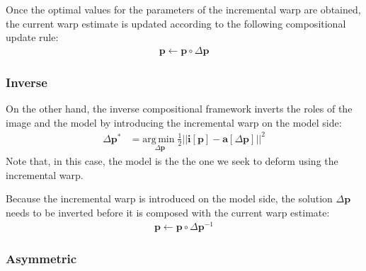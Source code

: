 Once the optimal values for the parameters of the incremental warp are obtained, the current warp estimate is updated according to the following compositional update rule:
\begin{equation}
 	\begin{aligned}
    	\mathbf{p} \leftarrow \mathbf{p} \circ \Delta \mathbf{p}
    \label{eq:fc_update}
    \end{aligned}
\end{equation}

\subsubsection{Inverse}
\label{sec:inverse}

On the other hand, the inverse compositional framework inverts the roles of the image and the model by introducing the incremental warp on the model side:
\begin{equation}
    \begin{aligned}
        \Delta \mathbf{p}^* & = \underset{\Delta \mathbf{p}} {\mathrm{arg\, min\;}} \frac{1}{2}|| \mathbf{i}[\mathbf{p}] - \mathbf{a} [\Delta \mathbf{p}] ||^2
    \label{eq:ssd_ic}
    \end{aligned}
\end{equation}
Note that, in this case, the model is the the one we seek to deform using the incremental warp.

Because the incremental warp is introduced on the model side, the solution $\Delta \mathbf{p}$ needs to be inverted before it is composed with the current warp estimate:
\begin{equation}
 	\begin{aligned}
    	\mathbf{p} \leftarrow \mathbf{p} \circ \Delta {\mathbf{p}}^{-1} 
    \label{eq:ic_update}
    \end{aligned}
\end{equation}

\subsubsection{Asymmetric}
\label{sec:asymmetric}

